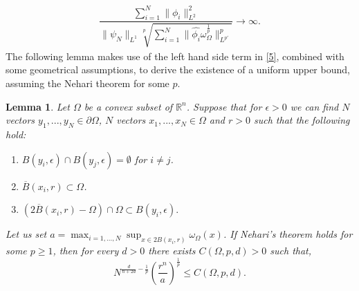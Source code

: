 \documentclass[footinclude=true]{amsart}
\theoremstyle{plain}
\newtheorem{lm}[theo]{Lemma}
\begin{document}
	\begin{eqnarray}\label{5}
		\dfrac{\sum_{i=1}^{N}\|\phi_{i}\|^{2}_{L^{2}}}{\|\psi_{N}\|_{L^{1}}\sqrt[p]{\sum_{i=1}^{N}\|\widehat{\phi_{i}}\omega_{\Omega}^{\frac{1}{p}}\|^{p}_{L^{p'}}}}\to \infty. 
	\end{eqnarray}
	The following lemma makes use of the left hand side term in \eqref{5}, combined with some geometrical assumptions, to derive the existence of a uniform upper bound, assuming the Nehari theorem for some $p$.
	\begin{lm}\label{generalnegation}
		Let $\Omega$ be a convex subset of $\mathbb{R}^{n}$. Suppose that for $\epsilon>0$ we can find $N$ vectors $y_{1},...,y_{N}\in \partial\Omega$, $N$ vectors $x_{1},...,x_{N}\in\Omega$ and $r>0$ such that the following hold:
		\begin{enumerate}
			\item \label{prop1} $B(y_{i},\epsilon)\cap B(y_{j},\epsilon)=\emptyset$ for $i\neq j$.
			\item \label{prop2} $\overline{B}(x_{i},r)\subset\Omega$.
			\item \label{prop3} $(2\overline{B}(x_{i},r)-\Omega)\cap\Omega\subset B(y_{i},\epsilon).$
		\end{enumerate}
		Let us set $a=\max_{i=1,...,N}\sup_{x\in 2B(x_{i},r)}\omega_{\Omega}(x)$. If Nehari's theorem holds for some $p\geq 1$, then for every $d>0$ there exists $C(\Omega,p,d)>0$ such that, $$N^{\frac{d}{n+2d}-\frac{1}{p}}\left(\frac{r^{n}}{a}\right)^{\frac{1}{p}}\leq C(\Omega,p,d).$$
	\end{lm}
\end{document}
